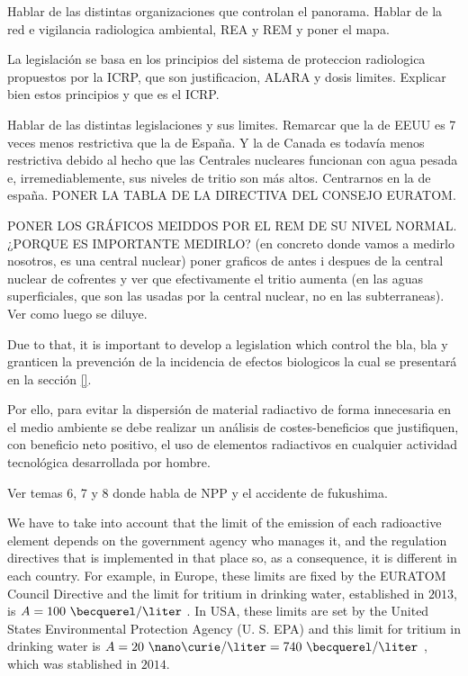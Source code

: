 Hablar de las distintas organizaciones que controlan el panorama. Hablar de la red e vigilancia radiologica ambiental, REA y REM y poner el mapa.

La legislación se basa en los principios del sistema de proteccion radiologica propuestos por la ICRP, que son justificacion, ALARA y dosis limites. Explicar bien estos principios y que es el ICRP.

Hablar de las distintas legislaciones y sus limites. Remarcar que la de EEUU es 7 veces menos restrictiva que la de España. Y la de Canada es todavía menos restrictiva debido al hecho que las Centrales nucleares funcionan con agua pesada e, irremediablemente, sus niveles de tritio son más altos. Centrarnos en la de españa. PONER LA TABLA DE LA DIRECTIVA DEL CONSEJO EURATOM.


PONER LOS GRÁFICOS MEIDDOS POR EL REM DE SU NIVEL NORMAL. ¿PORQUE ES IMPORTANTE MEDIRLO? (en concreto donde vamos a medirlo nosotros, es una central nuclear) poner graficos de antes i despues de la central nuclear de cofrentes y ver que efectivamente el tritio aumenta (en las aguas superficiales, que son las usadas por la central nuclear, no en las subterraneas). Ver como luego se diluye.



Due to that, it is important to develop a legislation which control the bla, bla y granticen la prevención de la incidencia de efectos biologicos la cual se presentará en la sección \ref{}. 

Por ello, para evitar la dispersión de material radiactivo de forma innecesaria en el medio ambiente se debe realizar un análisis de costes-beneficios que justifiquen, con beneficio neto positivo, el uso de elementos radiactivos en cualquier actividad tecnológica desarrollada por hombre.

Ver temas 6, 7 y 8 donde habla de NPP y el accidente de fukushima.


We have to take into account that the limit of the emission of each radioactive element depends on the government agency who manages it, and the regulation directives that is implemented in that place so, as a consequence, it is different in each country. For example, in Europe, these limits are fixed by the EURATOM Council Directive and the limit for tritium in drinking water, established in $2013$, is $A = 100~\becquerel/\liter$ \cite{100BqL}. In USA, these limits are set by the United States Environmental Protection Agency (U. S. EPA) and this limit for tritium in drinking water is $A = 20~\nano\curie/\liter = 740~\becquerel/\liter$ \cite{740BqL}, which was stablished in $2014$.